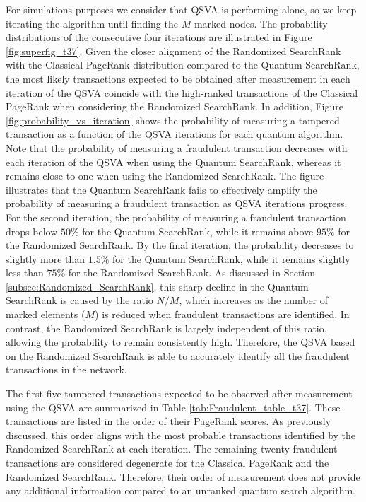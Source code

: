 \documentclass[nofootinbib,aps,prd,reprint,superscriptaddress,floatfix]{revtex4-2}
\begin{document}
For simulations purposes we consider that QSVA is performing alone, so we keep iterating the algorithm until finding the $M$ marked nodes. The probability distributions of the consecutive four iterations are illustrated in Figure \ref{fig:superfig_t37}. Given the closer alignment of the Randomized SearchRank with the Classical PageRank distribution compared to the Quantum SearchRank, the most likely transactions expected to be obtained after measurement in each iteration of the QSVA coincide with the high-ranked transactions of the Classical PageRank when considering the Randomized SearchRank.
In addition, Figure \ref{fig:probability_vs_iteration} shows the probability of measuring a tampered transaction as a function of the QSVA iterations for each quantum algorithm. Note that the probability of measuring a fraudulent transaction decreases with each iteration of the QSVA when using the Quantum SearchRank, whereas it remains close to one when using the Randomized SearchRank. The figure illustrates that the Quantum SearchRank fails to effectively amplify the probability of measuring a fraudulent transaction as QSVA iterations progress. For the second iteration, the probability of measuring a fraudulent transaction drops below $50\%$ for the Quantum SearchRank, while it remains above $95\%$ for the Randomized SearchRank. By the final iteration, the probability decreases to slightly more than $1.5\%$ for the Quantum SearchRank, while it remains slightly less than $75\%$ for the Randomized SearchRank. As discussed in Section \ref{subsec:Randomized_SearchRank}, this sharp decline in the Quantum SearchRank is caused by the ratio $N/M$, which increases as the number of marked elements ($M$) is reduced when fraudulent transactions are identified. In contrast, the Randomized SearchRank is largely independent of this ratio, allowing the probability to remain consistently high. Therefore, the QSVA based on the Randomized SearchRank is able to accurately identify all the fraudulent transactions in the network. 

The first five tampered transactions expected to be observed after measurement using the QSVA are summarized in Table \ref{tab:Fraudulent_table_t37}. These transactions are listed in the order of their PageRank scores. As previously discussed, this order aligns with the most probable transactions identified by the Randomized SearchRank at each iteration. The remaining twenty fraudulent transactions are considered degenerate for the Classical PageRank and the Randomized SearchRank. Therefore, their order of measurement does not provide any additional information compared to an unranked quantum search algorithm.
\end{document}
